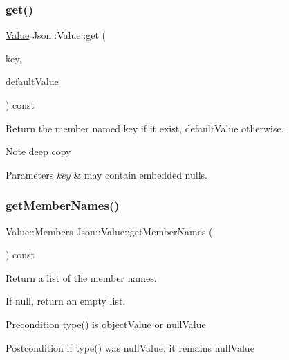 \subsubsection{\texorpdfstring{get()}{get()}\hspace{0.1cm}{\footnotesize\ttfamily [4/4]}}
{\footnotesize\ttfamily \hyperlink{classJson_1_1Value}{Value} Json\+::\+Value\+::get (\begin{DoxyParamCaption}\item[{const J\+S\+O\+N\+C\+P\+P\+\_\+\+S\+T\+R\+I\+NG \&}]{key,  }\item[{const \hyperlink{classJson_1_1Value}{Value} \&}]{default\+Value }\end{DoxyParamCaption}) const}

Return the member named key if it exist, default\+Value otherwise. \begin{DoxyNote}{Note}
deep copy 
\end{DoxyNote}

\begin{DoxyParams}{Parameters}
{\em key} & may contain embedded nulls. \\
\hline
\end{DoxyParams}
\mbox{\label{classJson_1_1Value_a79d7725dce6260317333e69022367ac9}} 
\subsubsection{\texorpdfstring{get\+Member\+Names()}{getMemberNames()}}
{\footnotesize\ttfamily Value\+::\+Members Json\+::\+Value\+::get\+Member\+Names (\begin{DoxyParamCaption}{ }\end{DoxyParamCaption}) const}



Return a list of the member names. 

If null, return an empty list. \begin{DoxyPrecond}{Precondition}
type() is object\+Value or null\+Value 
\end{DoxyPrecond}
\begin{DoxyPostcond}{Postcondition}
if type() was null\+Value, it remains null\+Value 
\end{DoxyPostcond}
\mbox{\label{classJson_1_1Value_a2e1b7be6bde2fe23f15290d9ddbbdf8a}} 

